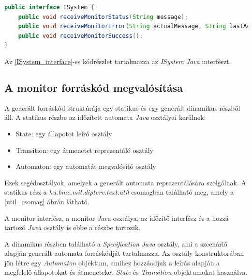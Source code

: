 \begin{lstlisting}[language=java,frame=single, float=h!, caption={Rendszer interfész Java implementációja.},captionpos=b, label=ISystem_interface]
public interface ISystem {
	public void receiveMonitorStatus(String message);
	public void receiveMonitorError(String actualMessage, String lastAcceptedMessage);
	public void receiveMonitorSuccess();
}
\end{lstlisting}

Az \ref{ISystem_interface}-es kódrészlet tartalmazza az \textit{ISystem} \textit{Java} interfészt.

\subsection{A monitor forráskód megvalósítása}
A generált forráskód struktúrája egy statikus és egy generált dinamikus részből áll.
A statikus részbe az időzített automata \textit{Java} osztályai kerülnek:
\begin{itemize}
    \item State: egy állapotot leíró osztály
    \item Transition: egy átmenetet reprezentáló osztály
    \item Automaton: egy automatát megvalósító osztály
\end{itemize}
Ezek segédosztályok, amelyek a generált automata reprezentálására szolgálnak.
A statikus rész a \textit{hu.bme.mit.dipterv.text.util} csomagban található meg, amely a \ref{util_csomag} ábrán látható.

A monitor interfész, a monitor \textit{Java} osztálya, az időzítő interfész és a hozzá tartozó \textit{Java} osztály is ebbe a részbe tartozik.

A dinamikus részben található a \textit{Specification} \textit{Java} osztály, ami a szcenárió alapján generált automata forráskódját tartalmazza.
Az osztály konstruktorában jön létre egy \textit{Automaton} objektum, amihez hozzáadjuk a leírás alapján a megfelelő állapotokat és átmeneteket \textit{State} és \textit{Transition} objektumokat használva.

